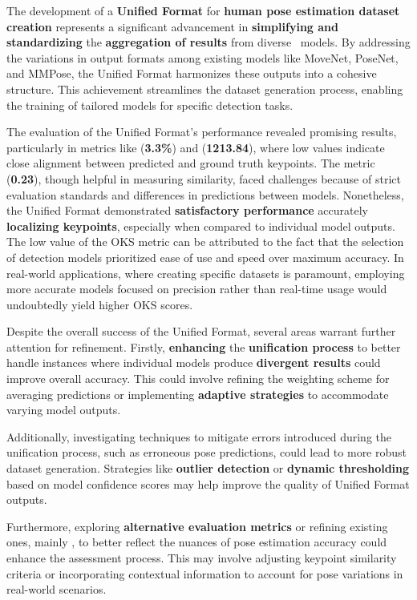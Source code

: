 The development of a {\bf Unified Format} for {\bf human pose estimation dataset creation} represents a significant advancement in {\bf simplifying and standardizing} the {\bf aggregation of results} from diverse \NN\ models. By addressing the variations in output formats among existing models like MoveNet, PoseNet, and MMPose, the Unified Format harmonizes these outputs into a cohesive structure. This achievement streamlines the dataset generation process, enabling the training of tailored models for specific detection tasks.

The evaluation of the Unified Format's performance revealed promising results, particularly in metrics like {\bf \APE} ({\bf 3.3\%}) and {\bf \MSE} ({\bf 1213.84}), where low values indicate close alignment between predicted and ground truth keypoints. The {\bf \OKS} metric ({\bf 0.23}), though helpful in measuring similarity, faced challenges because of strict evaluation standards and differences in predictions between models. Nonetheless, the Unified Format demonstrated {\bf satisfactory performance} accurately {\bf localizing keypoints}, especially when compared to individual model outputs. The low value of the OKS metric can be attributed to the fact that the selection of detection models prioritized ease of use and speed over maximum accuracy. In real-world applications, where creating specific datasets is paramount, employing more accurate models focused on precision rather than real-time usage would undoubtedly yield higher OKS scores.

Despite the overall success of the Unified Format, several areas warrant further attention for refinement. Firstly, {\bf enhancing} the {\bf unification process} to better handle instances where individual models produce {\bf divergent results} could improve overall accuracy. This could involve refining the weighting scheme for averaging predictions or implementing {\bf adaptive strategies} to accommodate varying model outputs.

Additionally, investigating techniques to mitigate errors introduced during the unification process, such as erroneous pose predictions, could lead to more robust dataset generation. Strategies like {\bf outlier detection} or {\bf dynamic thresholding} based on model confidence scores may help improve the quality of Unified Format outputs.

Furthermore, exploring {\bf alternative evaluation metrics} or refining existing ones, mainly {\bf \OKS}, to better reflect the nuances of pose estimation accuracy could enhance the assessment process. This may involve adjusting keypoint similarity criteria or incorporating contextual information to account for pose variations in real-world scenarios.

